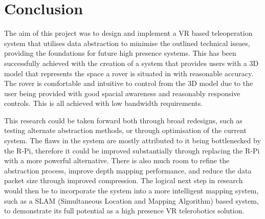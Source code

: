 \chapter{Conclusion}
\label{chapter:conclusion}

The aim of this project was to design and implement a VR based teleoperation system that utilises data abstraction to minimise the outlined technical issues, providing the foundations for future high presence systems. This has been successfully achieved with the creation of a system that provides users with a 3D model that represents the space a rover is situated in with reasonable accuracy. The rover is comfortable and intuitive to control from the 3D model due to the user being provided with good spacial awareness and reasonably responsive controls. This is all achieved with low bandwidth requirements.

This research could be taken forward both through broad redesigns, such as testing alternate abstraction methods, or through optimisation of the current system. The flaws in the system are mostly attributed to it being bottlenecked by the R-Pi, therefore it could be improved substantially through replacing the R-Pi with a more powerful alternative. There is also much room to refine the abstraction process, improve depth mapping performance, and reduce the data packet size through improved compression. The logical next step in research would then be to incorporate the system into a more intelligent mapping system, such as a SLAM (Simultaneous Location and Mapping Algorithm) based system, to demonstrate its full potential as a high presence VR telerobotics solution.